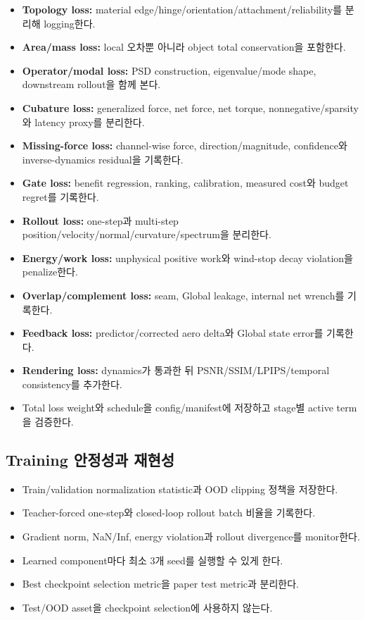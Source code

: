 \documentclass[10pt,a4paper]{article}
\newcommand{\todo}{\textcolor{TodoGray}{\(\square\)}}
\begin{document}
\begin{itemize}
  \item[\todo] \textbf{Topology loss:} material edge/hinge/orientation/attachment/reliability를 분리해 logging한다.
  \item[\todo] \textbf{Area/mass loss:} local 오차뿐 아니라 object total conservation을 포함한다.
  \item[\todo] \textbf{Operator/modal loss:} PSD construction, eigenvalue/mode shape, downstream rollout을 함께 본다.
  \item[\todo] \textbf{Cubature loss:} generalized force, net force, net torque, nonnegative/sparsity와 latency proxy를 분리한다.
  \item[\todo] \textbf{Missing-force loss:} channel-wise force, direction/magnitude, confidence와 inverse-dynamics residual을 기록한다.
  \item[\todo] \textbf{Gate loss:} benefit regression, ranking, calibration, measured cost와 budget regret를 기록한다.
  \item[\todo] \textbf{Rollout loss:} one-step과 multi-step position/velocity/normal/curvature/spectrum을 분리한다.
  \item[\todo] \textbf{Energy/work loss:} unphysical positive work와 wind-stop decay violation을 penalize한다.
  \item[\todo] \textbf{Overlap/complement loss:} seam, Global leakage, internal net wrench를 기록한다.
  \item[\todo] \textbf{Feedback loss:} predictor/corrected aero delta와 Global state error를 기록한다.
  \item[\todo] \textbf{Rendering loss:} dynamics가 통과한 뒤 PSNR/SSIM/LPIPS/temporal consistency를 추가한다.
  \item[\todo] Total loss weight와 schedule을 config/manifest에 저장하고 stage별 active term을 검증한다.
\end{itemize}

\subsection{Training 안정성과 재현성}

\begin{itemize}
  \item[\todo] Train/validation normalization statistic과 OOD clipping 정책을 저장한다.
  \item[\todo] Teacher-forced one-step와 closed-loop rollout batch 비율을 기록한다.
  \item[\todo] Gradient norm, NaN/Inf, energy violation과 rollout divergence를 monitor한다.
  \item[\todo] Learned component마다 최소 3개 seed를 실행할 수 있게 한다.
  \item[\todo] Best checkpoint selection metric을 paper test metric과 분리한다.
  \item[\todo] Test/OOD asset을 checkpoint selection에 사용하지 않는다.
\end{itemize}
\end{document}

